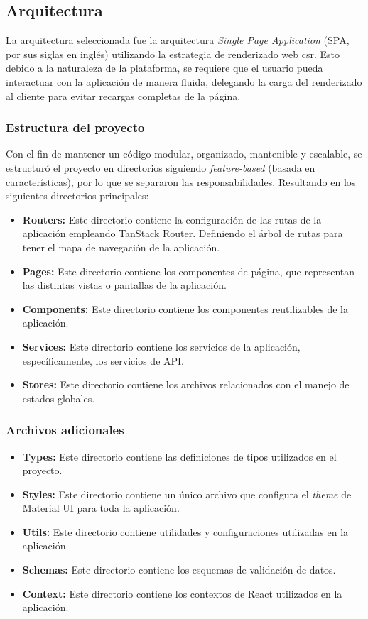 \subsection{Arquitectura}
La arquitectura seleccionada fue la arquitectura \textit{Single Page Application} (SPA, por sus siglas en inglés)
utilizando la estrategia de renderizado web \gls{csr}. Esto debido a la naturaleza de la plataforma,
se requiere que el usuario pueda interactuar con la aplicación de manera fluida, delegando la carga del renderizado
al cliente para evitar recargas completas de la página.

\subsubsection{Estructura del proyecto}
Con el fin de mantener un código modular, organizado, mantenible y escalable, se estructuró el proyecto en directorios
siguiendo \textit{feature-based} (basada en características), por lo que se separaron las responsabilidades.
Resultando en los siguientes directorios principales:
\begin{itemize}
    \item \textbf{Routers:} Este directorio contiene la configuración de las rutas de la aplicación empleando TanStack
            Router. Definiendo el árbol de rutas para tener el mapa de navegación de la aplicación.
    \item \textbf{Pages:} Este directorio contiene los componentes de página, que representan las distintas vistas o
            pantallas de la aplicación.
    \item \textbf{Components:} Este directorio contiene los componentes reutilizables de la aplicación.
    \item \textbf{Services:} Este directorio contiene los servicios de la aplicación, específicamente, los servicios de API.
    \item \textbf{Stores:} Este directorio contiene los archivos relacionados con el manejo de estados globales.
\end{itemize}

\subsubsection{Archivos adicionales}
\begin{itemize}
    \item \textbf{Types:} Este directorio contiene las definiciones de tipos utilizados en el proyecto.
    \item \textbf{Styles:} Este directorio contiene un único archivo que configura el \textit{theme} de Material UI
            para toda la aplicación.
    \item \textbf{Utils:} Este directorio contiene utilidades y configuraciones utilizadas en la aplicación.
    \item \textbf{Schemas:} Este directorio contiene los esquemas de validación de datos.
    \item \textbf{Context:} Este directorio contiene los contextos de React utilizados en la aplicación.
\end{itemize}

